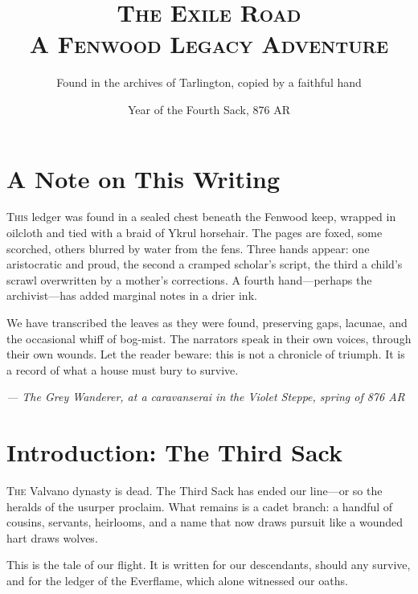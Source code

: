 \documentclass[11pt]{book}
\begin{document}
\frontmatter
\title{\Huge\scshape The Exile Road\\\large A Fenwood Legacy Adventure}
\author{Found in the archives of Tarlington, copied by a faithful hand}
\date{Year of the Fourth Sack, 876 AR}
\maketitle

\tableofcontents

\mainmatter

\chapter*{A Note on This Writing}
\lettrine{T}{his} ledger was found in a sealed chest beneath the Fenwood keep, wrapped in oilcloth and tied with a braid of Ykrul horsehair. The pages are foxed, some scorched, others blurred by water from the fens. Three hands appear: one aristocratic and proud, the second a cramped scholar's script, the third a child's scrawl overwritten by a mother's corrections. A fourth hand---perhaps the archivist---has added marginal notes in a drier ink.

We have transcribed the leaves as they were found, preserving gaps, lacunae, and the occasional whiff of bog-mist. The narrators speak in their own voices, through their own wounds. Let the reader beware: this is not a chronicle of triumph. It is a record of what a house must bury to survive.

\vspace{1em}
\noindent\textit{--- The Grey Wanderer, at a caravanserai in the Violet Steppe, spring of 876 AR}

\clearpage

\chapter{Introduction: The Third Sack}

\lettrine{T}{he} Valvano dynasty is dead. The Third Sack has ended our line---or so the heralds of the usurper proclaim. What remains is a cadet branch: a handful of cousins, servants, heirlooms, and a name that now draws pursuit like a wounded hart draws wolves.

This is the tale of our flight. It is written for our descendants, should any survive, and for the ledger of the Everflame, which alone witnessed our oaths.
\end{document}
